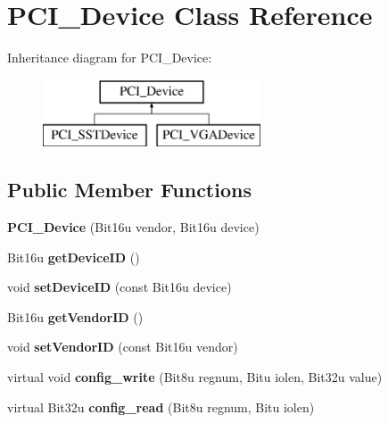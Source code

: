 \hypertarget{classPCI__Device}{\section{P\-C\-I\-\_\-\-Device Class Reference}
\label{classPCI__Device}
}
Inheritance diagram for P\-C\-I\-\_\-\-Device\-:\begin{figure}[H]
\begin{center}
\leavevmode
\includegraphics[height=2.000000cm]{classPCI__Device}
\end{center}
\end{figure}
\subsection*{Public Member Functions}
\begin{DoxyCompactItemize}
\item 
\hypertarget{classPCI__Device_a3e88023ba031fe2137b1b83307d10139}{{\bfseries P\-C\-I\-\_\-\-Device} (Bit16u vendor, Bit16u device)}\label{classPCI__Device_a3e88023ba031fe2137b1b83307d10139}

\item 
\hypertarget{classPCI__Device_aeffcee3f3604817e13621fd0af3c116c}{Bit16u {\bfseries get\-Device\-I\-D} ()}\label{classPCI__Device_aeffcee3f3604817e13621fd0af3c116c}

\item 
\hypertarget{classPCI__Device_ae301eac6564171b8ebd631f1f5a5b010}{void {\bfseries set\-Device\-I\-D} (const Bit16u device)}\label{classPCI__Device_ae301eac6564171b8ebd631f1f5a5b010}

\item 
\hypertarget{classPCI__Device_a250d9180675cc1d1b95c9c3bbb98cbc6}{Bit16u {\bfseries get\-Vendor\-I\-D} ()}\label{classPCI__Device_a250d9180675cc1d1b95c9c3bbb98cbc6}

\item 
\hypertarget{classPCI__Device_a77e5dc350044cbcf1d4282bd0960e29f}{void {\bfseries set\-Vendor\-I\-D} (const Bit16u vendor)}\label{classPCI__Device_a77e5dc350044cbcf1d4282bd0960e29f}

\item 
\hypertarget{classPCI__Device_a61dff5e6d0d2a159eb85c7fdbab85544}{virtual void {\bfseries config\-\_\-write} (Bit8u regnum, Bitu iolen, Bit32u value)}\label{classPCI__Device_a61dff5e6d0d2a159eb85c7fdbab85544}

\item 
\hypertarget{classPCI__Device_aa3b02b458e4c1907f654e34166f0cb81}{virtual Bit32u {\bfseries config\-\_\-read} (Bit8u regnum, Bitu iolen)}\label{classPCI__Device_aa3b02b458e4c1907f654e34166f0cb81}

\end{DoxyCompactItemize}
